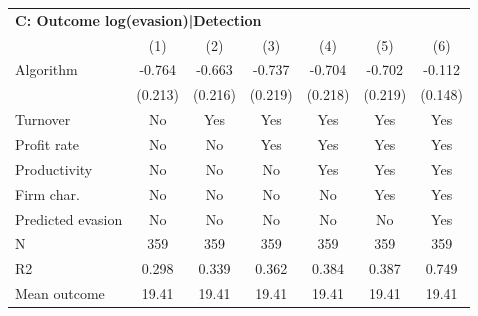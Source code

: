 \begin{tabular}{lcccccc}
\midrule \multicolumn{7}{l}{\textbf{C: Outcome log(evasion)|Detection}} \\ \multicolumn{1}{l}{} & (1) & (2) & (3) & (4) & (5) & (6) \\ \midrule
Algorithm   &      -0.764\sym{***}&      -0.663\sym{***}&      -0.737\sym{***}&      -0.704\sym{***}&      -0.702\sym{***}&      -0.112         \\
            &     (0.213)         &     (0.216)         &     (0.219)         &     (0.218)         &     (0.219)         &     (0.148)         \\
\midrule
Turnover    &          No         &         Yes         &         Yes         &         Yes         &         Yes         &         Yes         \\
Profit rate &          No         &          No         &         Yes         &         Yes         &         Yes         &         Yes         \\
Productivity&          No         &          No         &          No         &         Yes         &         Yes         &         Yes         \\
Firm char.  &          No         &          No         &          No         &          No         &         Yes         &         Yes         \\
Predicted evasion&          No         &          No         &          No         &          No         &          No         &         Yes         \\
N           &         359         &         359         &         359         &         359         &         359         &         359         \\
R2          &       0.298         &       0.339         &       0.362         &       0.384         &       0.387         &       0.749         \\
Mean outcome&       19.41         &       19.41         &       19.41         &       19.41         &       19.41         &       19.41         \\
\bottomrule \end{tabular}
